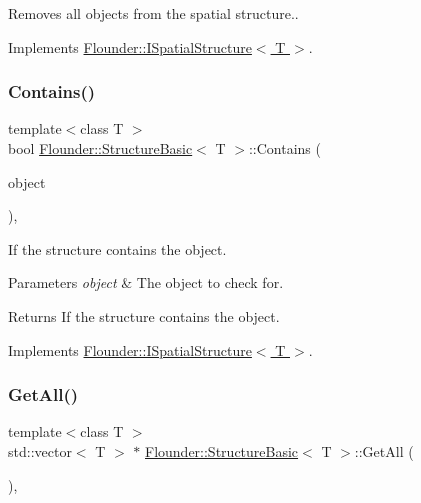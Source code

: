 Removes all objects from the spatial structure.. 



Implements \hyperlink{class_flounder_1_1_i_spatial_structure_a4a15975fe4c6505707a6d8c447809c76}{Flounder\+::\+I\+Spatial\+Structure$<$ T $>$}.

\mbox{\label{class_flounder_1_1_structure_basic_ab49e0b2fa705150cb4a0f1eb95a8d096}} 
\subsubsection{\texorpdfstring{Contains()}{Contains()}}
{\footnotesize\ttfamily template$<$class T $>$ \\
bool \hyperlink{class_flounder_1_1_structure_basic}{Flounder\+::\+Structure\+Basic}$<$ T $>$\+::Contains (\begin{DoxyParamCaption}\item[{\hyperlink{class_flounder_1_1_i_spatial_object}{I\+Spatial\+Object} $\ast$}]{object }\end{DoxyParamCaption})\hspace{0.3cm}{\ttfamily [override]}, {\ttfamily [virtual]}}



If the structure contains the object. 


\begin{DoxyParams}{Parameters}
{\em object} & The object to check for. \\
\hline
\end{DoxyParams}
\begin{DoxyReturn}{Returns}
If the structure contains the object. 
\end{DoxyReturn}


Implements \hyperlink{class_flounder_1_1_i_spatial_structure_ae054d2ec399867ef48f33e693659f6cd}{Flounder\+::\+I\+Spatial\+Structure$<$ T $>$}.

\mbox{\label{class_flounder_1_1_structure_basic_ab4d0ecf6a9efeb993af50fa77b4b27d1}} 
\subsubsection{\texorpdfstring{Get\+All()}{GetAll()}}
{\footnotesize\ttfamily template$<$class T $>$ \\
std\+::vector$<$ T $>$ $\ast$ \hyperlink{class_flounder_1_1_structure_basic}{Flounder\+::\+Structure\+Basic}$<$ T $>$\+::Get\+All (\begin{DoxyParamCaption}{ }\end{DoxyParamCaption})\hspace{0.3cm}{\ttfamily [override]}, {\ttfamily [virtual]}}



